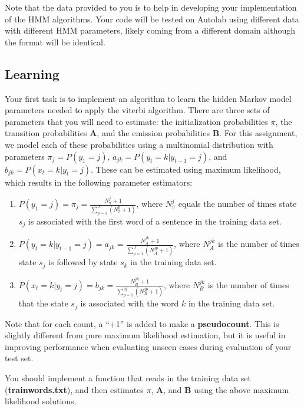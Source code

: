 \documentclass{article}
\begin{document}
Note that the data provided to you is to help in developing your implementation of the HMM algorithms. Your code will be tested on Autolab using different data with different HMM parameters, likely coming from a different domain although the format will be identical.

\subsection{Learning}\label{learn}
Your first task is to implement an algorithm to learn the hidden Markov model parameters needed to apply the viterbi algorithm. There are three sets of parameters that you will need to estimate: the initialization probabilities {\boldmath$\pi$}, the transition probabilities $\mathbf A$, and the emission probabilities $\mathbf B$. For this assignment, we model each of these probabilities using a multinomial distribution with parameters $ \pi_j=P(y_1=j)$, $ a_{jk} = P(y_{t}=k\vert y_{t-1}=j)$, and $ b_{jk} = P(x_t=k\vert y_{t}=j)$. These can be estimated using maximum likelihood, which results in the following parameter estimators:

\begin{enumerate}
    \item $P(y_1 = j) = \pi_j = \frac{N_\pi^j+1}{\sum_{p=1}^{J}(N_\pi^p+1)}$, where $N_\pi^j$ equals the number of times state $s_j$ is associated with the first word of a sentence in the training data set.
    \item $P(y_{t} = k\vert y_{t-1}=j) = a_{jk}= \frac{N_A^{jk}+1}{\sum_{p=1}^J (N_A^{jp}+1)}$, where $N_A^{jk}$ is the number of times state $s_j$ is followed by state $s_k$ in the training data set.  
    \item $P(x_{t} = k\vert y_{t}=j) = b_{jk}= \frac{N_B^{jk}+1}{\sum_{p=1}^M (N_B^{jp}+1)}$, where $N_B^{jk}$ is the number of times that the state $s_j$ is associated with the word $k$ in the training data set.
\end{enumerate}

Note that for each count, a ``+1'' is added to make a \textbf{pseudocount}. This is slightly different from pure maximum likelihood estimation, but it is useful in improving performance when evaluating unseen cases during evaluation of your test set.

You should implement a function that reads in the training data set (\textbf{trainwords.txt}), and then estimates {\boldmath$\pi$}, $\mathbf A$, and $\mathbf B$ using the above maximum likelihood solutions. 
\end{document}
